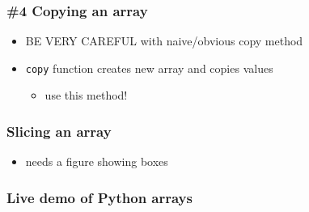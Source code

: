 \documentclass[14pt]{beamer}
\newcommand\red[1]{{\color{red} #1}}
\begin{document}

\begin{frame}[fragile]

\frametitle{\#4 Copying an array}

\begin{itemize}
	\item \red{BE VERY CAREFUL} with naive/obvious copy method
	\item \texttt{copy} function creates new array and copies values
	\begin{itemize}
		\item use this method!
	\end{itemize}
\end{itemize}

\end{frame}


\begin{frame}[fragile]

\frametitle{Slicing an array}

\begin{itemize}
	\item needs a figure showing boxes
\end{itemize}

\end{frame}


\begin{frame}[fragile]
\frametitle{Live demo of Python arrays}

\end{frame}

%
%
%
%
%
%
%
%
%
%
%
\end{document}
